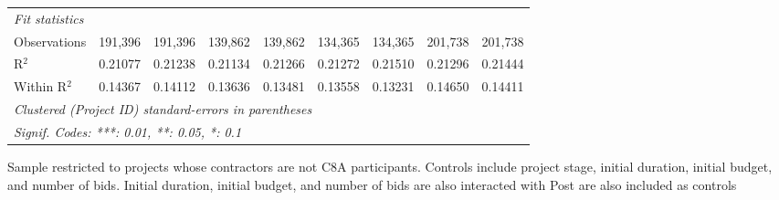 \documentclass[
]{article}
\begin{document}
\begin{table}[htbp]
\begin{tabular}{lcccccccc}
      \midrule
      \emph{Fit statistics}\\
      Observations             & 191,396       & 191,396       & 139,862       & 139,862       & 134,365       & 134,365       & 201,738       & 201,738\\  
      R$^2$                    & 0.21077       & 0.21238       & 0.21134       & 0.21266       & 0.21272       & 0.21510       & 0.21296       & 0.21444\\  
      Within R$^2$             & 0.14367       & 0.14112       & 0.13636       & 0.13481       & 0.13558       & 0.13231       & 0.14650       & 0.14411\\  
      \midrule \midrule
      \multicolumn{9}{l}{\emph{Clustered (Project ID) standard-errors in parentheses}}\\
      \multicolumn{9}{l}{\emph{Signif. Codes: ***: 0.01, **: 0.05, *: 0.1}}\\
   \end{tabular}
   
   \par \raggedright 
   Sample restricted to projects whose contractors are not C8A participants. Controls include project stage, initial duration, initial budget, and number of bids. Initial duration, initial budget, and number of bids are also interacted with Post are also included as controls
\end{table}
\end{document}
